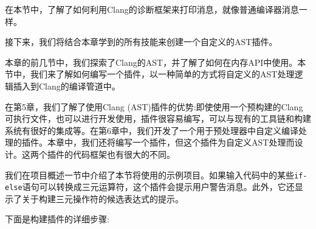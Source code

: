 在本节中，了解了如何利用Clang的诊断框架来打印消息，就像普通编译器消息一样。

接下来，我们将结合本章学到的所有技能来创建一个自定义的AST插件。


本章的前几节中，我们探索了Clang的AST，并了解了如何在内存API中使用。本节中，我们来了解如何编写一个插件，以一种简单的方式将自定义的AST处理逻辑插入到Clang的编译管道中。

在第5章，我们了解了使用Clang (AST)插件的优势:即使使用一个预构建的Clang可执行文件，也可以进行开发使用，插件很容易编写，可以与现有的工具链和构建系统有很好的集成等。在第6章中，我们开发了一个用于预处理器中自定义编译处理的插件。本章中，我们还将编写一个插件，但这个插件为自定义AST处理而设计。这两个插件的代码框架也有很大的不同。

我们在项目概述一节中介绍了本节将使用的示例项目。如果输入代码中的某些\texttt{if-else}语句可以转换成三元运算符，这个插件会提示用户警告消息。此外，它还显示了关于构建三元操作符的候选表达式的提示。

下面是构建插件的详细步骤:


